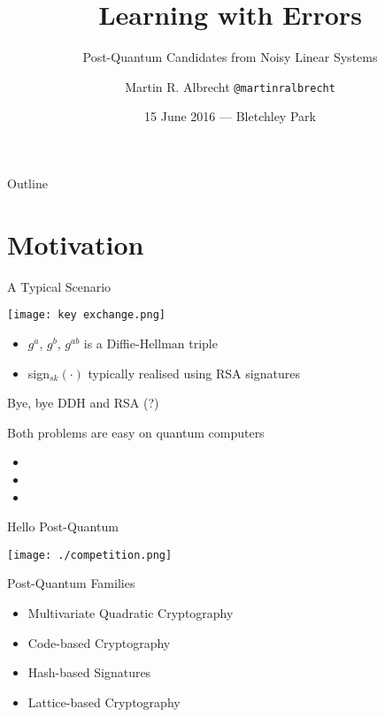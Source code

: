 \documentclass[presentation,smaller]{beamer}
\author{Martin R. Albrecht \texttt{@martinralbrecht}}
\date{15 June 2016 — Bletchley Park}
\title{Learning with Errors}
\subtitle{Post-Quantum Candidates from Noisy Linear Systems}
\begin{document}
\maketitle
\begin{frame}{Outline}
\tableofcontents
\end{frame}


\section{Motivation}
\label{sec:orgheadline5}

\begin{frame}[label={sec:orgheadline1}]{A Typical Scenario}
\begin{center}
\texttt{[image: key exchange.png]}
\end{center}

\begin{itemize}
\item \(g^a\), \(g^b\), \(g^{ab}\) is a \alert{Diffie-Hellman} triple
\item sign\(_{sk}(⋅)\) typically realised using \alert{RSA} signatures
\end{itemize}
\end{frame}

\begin{frame}[label={sec:orgheadline2}]{Bye, bye DDH and RSA (?)}
\begin{center}
Both problems are easy on quantum computers
\end{center}

\pause

\begin{itemize}[<+->]
\item {}
\item {}
\item {}
\end{itemize}
\end{frame}


\begin{frame}[label={sec:orgheadline3}]{Hello Post-Quantum}
\begin{center}
\texttt{[image: ./competition.png]}
\end{center}
\end{frame}


\begin{frame}[label={sec:orgheadline4}]{Post-Quantum Families}
\begin{itemize}
\item Multivariate Quadratic Cryptography
\item Code-based Cryptography
\item Hash-based Signatures
\item \alert<2->{Lattice-based Cryptography}
\end{itemize}
\end{frame}
\end{document}
